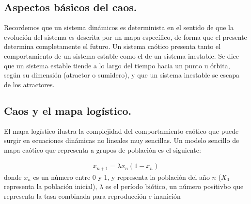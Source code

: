 \documentclass[10pt]{IEEEtran}
\begin{document}
\subsection*{Aspectos básicos del caos.}

Recordemos que un sistema dinámicos es determinista en el sentido de que la evolución del sistema es descrita por un mapa específico, de forma que el presente determina completamente el futuro. Un sistema caótico presenta tanto el comportamiento de un sistema estable como el de un sistema inestable. Se dice que un sistema estable tiende a lo largo del tiempo hacia un punto u órbita, según su dimensión (atractor o sumidero), y que un sistema inestable se escapa de los atractores. 
\subsection*{Caos y el mapa logístico.}
El mapa logístico ilustra la complejidad del comportamiento caótico que puede surgir en ecuaciones dinámicas no lineales muy sencillas. 
Un modelo sencillo de mapa caótico que representa a grupos de población es el siguiente:

\begin{equation*}
\begin{aligned}
x_{n+1}=\lambda x_{n}(1-x_{n}) 
\end{aligned}
\end{equation*}
donde $x_{n}$ es un número entre 0 y 1, y representa la población del año $n$ ($X_{0}$ representa la población inicial), $\lambda$ es el período biótico, un número positivbo que representa la tasa combinada para reproducción e inanición
\end{document}

